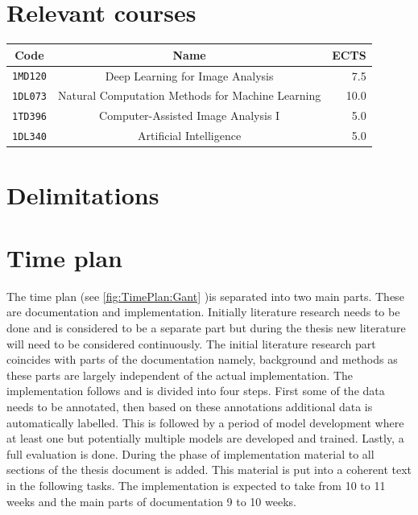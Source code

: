 \documentclass[a4paper,11pt]{article}
\begin{document}
\section{Relevant courses}

\begin{table}[H]
    \centering
    \begin{tabular}{|c|c|r|} 
        \hline
        Code & Name & ECTS \\
        \hline
        \texttt{1MD120} & Deep Learning for Image Analysis & 7.5 \\
        \texttt{1DL073} & Natural Computation Methods for Machine Learning & 10.0 \\
        \texttt{1TD396} & Computer-Assisted Image Analysis I & 5.0\\
        \texttt{1DL340} & Artificial Intelligence & 5.0\\
        \hline
    \end{tabular}
\end{table}

\section{Delimitations}


\section{Time plan}

The time plan (see \autoref{fig:TimePlan:Gant} )is separated into two main parts. These are documentation and implementation. Initially literature research needs to be done and is considered to be a separate part but during the thesis new literature will need to be considered continuously. The initial literature research part coincides with parts of the documentation namely, background and methods as these parts are largely independent of the actual implementation. The implementation follows and is divided into four steps. First some of the data needs to be annotated, then based on these annotations additional data is automatically labelled. This is followed by a period of model development where at least one but potentially multiple models are developed and trained. Lastly, a full evaluation is done. During the phase of implementation material to all sections of the thesis document is added. This material is put into a coherent text in the following tasks. The implementation is expected to take from 10 to 11 weeks and the main parts of documentation 9 to 10 weeks.
\end{document}
